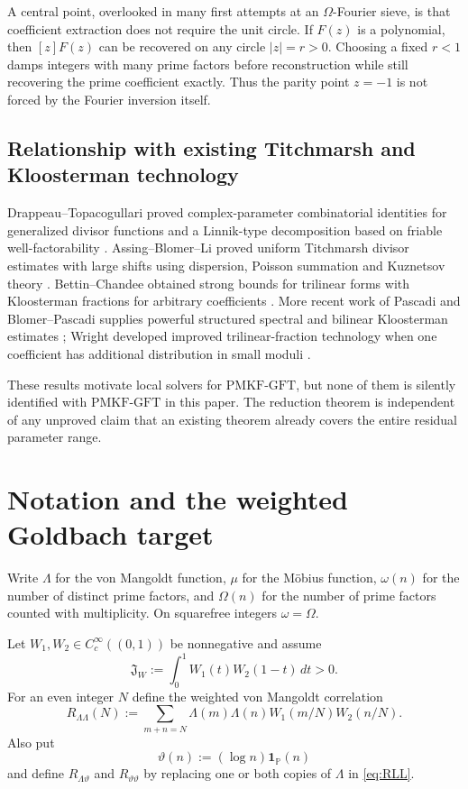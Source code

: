 \documentclass[11pt]{article}
\theoremstyle{definition}
\theoremstyle{remark}
\newcommand{\Pp}{\mathbb P}
\newcommand{\1}{\mathbf 1}
\newcommand{\PMKF}{\mathrm{PMKF}\text{-}\mathrm{GFT}}
\begin{document}
A central point, overlooked in many first attempts at an $\Omega$-Fourier sieve, is that coefficient extraction does not require the unit circle.  If $F(z)$ is a polynomial, then $[z]F(z)$ can be recovered on any circle $|z|=r>0$.  Choosing a fixed $r<1$ damps integers with many prime factors before reconstruction while still recovering the prime coefficient exactly.  Thus the parity point $z=-1$ is not forced by the Fourier inversion itself.

\subsection{Relationship with existing Titchmarsh and Kloosterman technology}

Drappeau--Topacogullari proved complex-parameter combinatorial identities for generalized divisor functions and a Linnik-type decomposition based on friable well-factorability \cite{DT}.  Assing--Blomer--Li proved uniform Titchmarsh divisor estimates with large shifts using dispersion, Poisson summation and Kuznetsov theory \cite{ABL}.  Bettin--Chandee obtained strong bounds for trilinear forms with Kloosterman fractions for arbitrary coefficients \cite{BC}.  More recent work of Pascadi and Blomer--Pascadi supplies powerful structured spectral and bilinear Kloosterman estimates \cite{PascadiLS,BP}; Wright developed improved trilinear-fraction technology when one coefficient has additional distribution in small moduli \cite{Wright}.

These results motivate local solvers for $\PMKF$, but none of them is silently identified with $\PMKF$ in this paper.  The reduction theorem is independent of any unproved claim that an existing theorem already covers the entire residual parameter range.

\section{Notation and the weighted Goldbach target}

Write $\Lambda$ for the von Mangoldt function, $\mu$ for the M\"obius function, $\omega(n)$ for the number of distinct prime factors, and $\Omega(n)$ for the number of prime factors counted with multiplicity.  On squarefree integers $\omega=\Omega$.

Let $W_1,W_2\in C_c^\infty((0,1))$ be nonnegative and assume
\begin{equation}\label{eq:J-positive}
\mathfrak J_W:=\int_0^1 W_1(t)W_2(1-t)\,dt>0.
\end{equation}
For an even integer $N$ define the weighted von Mangoldt correlation
\begin{equation}\label{eq:RLL}
R_{\Lambda\Lambda}(N)
:=
\sum_{m+n=N}\Lambda(m)\Lambda(n)
W_1(m/N)W_2(n/N).
\end{equation}
Also put
\begin{equation}\label{eq:theta-def}
\vartheta(n):=(\log n)\1_{\Pp}(n)
\end{equation}
and define $R_{\Lambda\vartheta}$ and $R_{\vartheta\vartheta}$ by replacing one or both copies of $\Lambda$ in \eqref{eq:RLL}.
\end{document}
